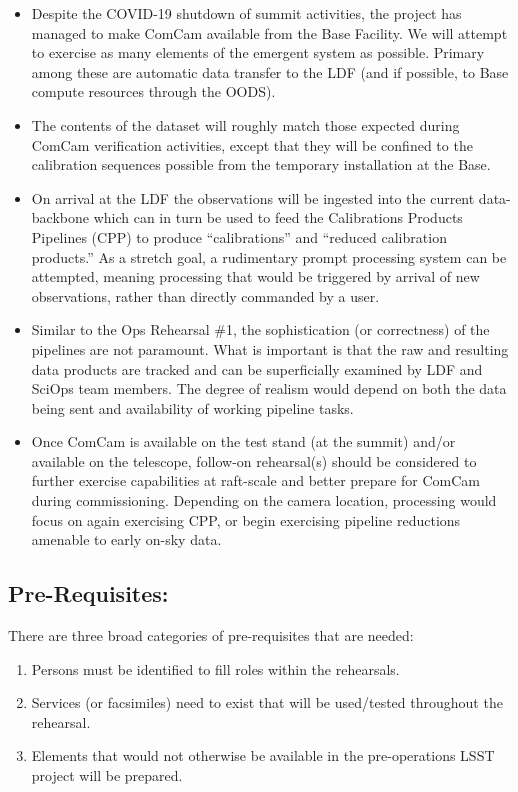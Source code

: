 \begin{itemize}[topsep=-8pt]
\item Despite the COVID-19 shutdown of summit activities, the project has 
managed to make ComCam available from the Base Facility.   We will attempt
to exercise as many elements of the emergent system as possible.  Primary
among these are automatic data transfer to the LDF (and if possible, to
Base compute resources through the OODS).

\item The contents of the dataset will roughly match those expected during 
ComCam verification activities, except that they will be confined to the
calibration sequences possible from the temporary installation at the Base.

\item On arrival at the LDF the observations will be ingested into the current
data-backbone which can in turn be used to feed the Calibrations Products
Pipelines (CPP) to produce ``calibrations'' and ``reduced calibration products.''
As a stretch goal, a rudimentary prompt processing system can be attempted,
meaning processing that would be triggered by arrival of new observations, rather
than directly commanded by a user.

\item Similar to the Ops Rehearsal \#1, the sophistication (or correctness)
of the pipelines are not paramount.  What is important is that the raw and
resulting data products are tracked and can be superficially examined by LDF and
SciOps team members.  The degree of realism would depend on both the data
being sent and availability of working pipeline tasks.

\item Once ComCam is available on the test stand (at the summit) and/or available
on the telescope, follow-on rehearsal(s) should be considered to further exercise
capabilities at raft-scale and better prepare for ComCam during commissioning.
Depending on the camera location, processing would focus on again exercising 
CPP, or begin exercising pipeline reductions amenable to early on-sky data.
\end{itemize}


\subsection{Pre-Requisites:}

There are three broad categories of pre-requisites that are needed:
\begin{enumerate}[topsep=-8pt]
\item Persons must be identified to fill roles within the rehearsals.
\item Services (or facsimiles) need to exist that will be used/tested throughout the 
rehearsal.
\item Elements that would not otherwise 
be available in the pre-operations LSST project will be prepared.
\end{enumerate}
 
